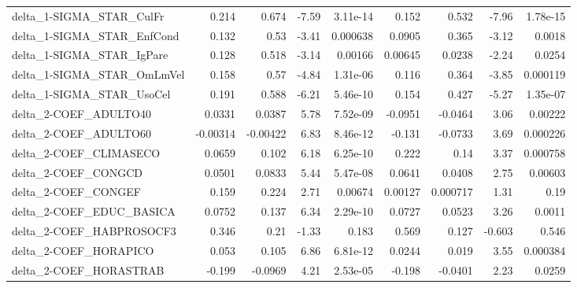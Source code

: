 \begin{tabular}{lrrrrrrrr}
delta\_1-SIGMA\_STAR\_CulFr              &       0.214 &        0.674 &    -7.59 & 3.11e-14 &      0.152 &       0.532 &        -7.96 &      1.78e-15 \\
delta\_1-SIGMA\_STAR\_EnfCond            &       0.132 &         0.53 &    -3.41 & 0.000638 &     0.0905 &       0.365 &        -3.12 &        0.0018 \\
delta\_1-SIGMA\_STAR\_IgPare             &       0.128 &        0.518 &    -3.14 &  0.00166 &    0.00645 &      0.0238 &        -2.24 &        0.0254 \\
delta\_1-SIGMA\_STAR\_OmLmVel            &       0.158 &         0.57 &    -4.84 & 1.31e-06 &      0.116 &       0.364 &        -3.85 &      0.000119 \\
delta\_1-SIGMA\_STAR\_UsoCel             &       0.191 &        0.588 &    -6.21 & 5.46e-10 &      0.154 &       0.427 &        -5.27 &      1.35e-07 \\
delta\_2-COEF\_ADULTO40                 &      0.0331 &       0.0387 &     5.78 & 7.52e-09 &    -0.0951 &     -0.0464 &         3.06 &       0.00222 \\
delta\_2-COEF\_ADULTO60                 &    -0.00314 &     -0.00422 &     6.83 & 8.46e-12 &     -0.131 &     -0.0733 &         3.69 &      0.000226 \\
delta\_2-COEF\_CLIMASECO                &      0.0659 &        0.102 &     6.18 & 6.25e-10 &      0.222 &        0.14 &         3.37 &      0.000758 \\
delta\_2-COEF\_CONGCD                   &      0.0501 &       0.0833 &     5.44 & 5.47e-08 &     0.0641 &      0.0408 &         2.75 &       0.00603 \\
delta\_2-COEF\_CONGEF                   &       0.159 &        0.224 &     2.71 &  0.00674 &    0.00127 &    0.000717 &         1.31 &          0.19 \\
delta\_2-COEF\_EDUC\_BASICA              &      0.0752 &        0.137 &     6.34 & 2.29e-10 &     0.0727 &      0.0523 &         3.26 &        0.0011 \\
delta\_2-COEF\_HABPROSOCF3              &       0.346 &         0.21 &    -1.33 &    0.183 &      0.569 &       0.127 &       -0.603 &         0.546 \\
delta\_2-COEF\_HORAPICO                 &       0.053 &        0.105 &     6.86 & 6.81e-12 &     0.0244 &       0.019 &         3.55 &      0.000384 \\
delta\_2-COEF\_HORASTRAB                &      -0.199 &      -0.0969 &     4.21 & 2.53e-05 &     -0.198 &     -0.0401 &         2.23 &        0.0259 \\

\end{tabular}
